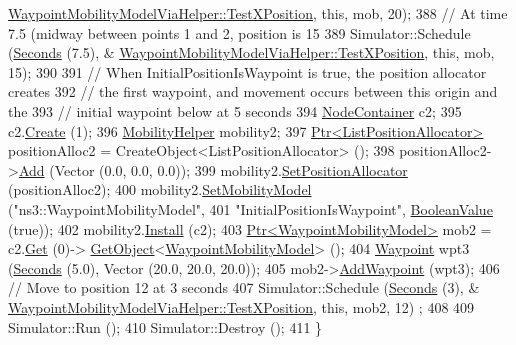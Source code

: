 \begin{DoxyCode}
      \hyperlink{classWaypointMobilityModelViaHelper_a89eb4e29a9b5de6d20b3fb24605080a5}{WaypointMobilityModelViaHelper::TestXPosition}, \textcolor{keyword}{this}, mob, 20);
388   \textcolor{comment}{// At time 7.5 (midway between points 1 and 2, position is 15}
389   Simulator::Schedule (\hyperlink{group__timecivil_ga33c34b816f8ff6628e33d5c8e9713b9e}{Seconds} (7.5), &
      \hyperlink{classWaypointMobilityModelViaHelper_a89eb4e29a9b5de6d20b3fb24605080a5}{WaypointMobilityModelViaHelper::TestXPosition}, \textcolor{keyword}{this}, mob, 15);
390 
391   \textcolor{comment}{// When InitialPositionIsWaypoint is true, the position allocator creates}
392   \textcolor{comment}{// the first waypoint, and movement occurs between this origin and the}
393   \textcolor{comment}{// initial waypoint below at 5 seconds}
394   \hyperlink{classns3_1_1NodeContainer}{NodeContainer} c2;
395   c2.\hyperlink{classns3_1_1NodeContainer_a787f059e2813e8b951cc6914d11dfe69}{Create} (1);
396   \hyperlink{classns3_1_1MobilityHelper}{MobilityHelper} mobility2;
397   \hyperlink{classns3_1_1Ptr}{Ptr<ListPositionAllocator>} positionAlloc2 = CreateObject<ListPositionAllocator>
       ();
398   positionAlloc2->\hyperlink{classns3_1_1ListPositionAllocator_a460e82f015ac012a73ba0ea0cccb3486}{Add} (Vector (0.0, 0.0, 0.0));
399   mobility2.\hyperlink{classns3_1_1MobilityHelper_ac59d5295076be3cc11021566713a28c5}{SetPositionAllocator} (positionAlloc2);
400   mobility2.\hyperlink{classns3_1_1MobilityHelper_a030275011b6f40682e70534d30280aba}{SetMobilityModel} (\textcolor{stringliteral}{"ns3::WaypointMobilityModel"},
401                               \textcolor{stringliteral}{"InitialPositionIsWaypoint"}, \hyperlink{classns3_1_1BooleanValue}{BooleanValue} (\textcolor{keyword}{true}));
402   mobility2.\hyperlink{classns3_1_1MobilityHelper_a07737960ee95c0777109cf2994dd97ae}{Install} (c2);
403   \hyperlink{classns3_1_1Ptr}{Ptr<WaypointMobilityModel>} mob2 = c2.\hyperlink{classns3_1_1NodeContainer_a9ed96e2ecc22e0f5a3d4842eb9bf90bf}{Get} (0)->
      \hyperlink{classns3_1_1Object_a13e18c00017096c8381eb651d5bd0783}{GetObject}<\hyperlink{classns3_1_1WaypointMobilityModel}{WaypointMobilityModel}> ();
404   \hyperlink{classns3_1_1Waypoint}{Waypoint} wpt3 (\hyperlink{group__timecivil_ga33c34b816f8ff6628e33d5c8e9713b9e}{Seconds} (5.0), Vector (20.0, 20.0, 20.0));
405   mob2->\hyperlink{classns3_1_1WaypointMobilityModel_ae16c90c21c463289bbea2b3499a94643}{AddWaypoint} (wpt3);
406   \textcolor{comment}{// Move to position 12 at 3 seconds}
407   Simulator::Schedule (\hyperlink{group__timecivil_ga33c34b816f8ff6628e33d5c8e9713b9e}{Seconds} (3), &
      \hyperlink{classWaypointMobilityModelViaHelper_a89eb4e29a9b5de6d20b3fb24605080a5}{WaypointMobilityModelViaHelper::TestXPosition}, \textcolor{keyword}{this}, mob2, 12)
      ;
408 
409   Simulator::Run ();
410   Simulator::Destroy ();
411 \}
\end{DoxyCode}


